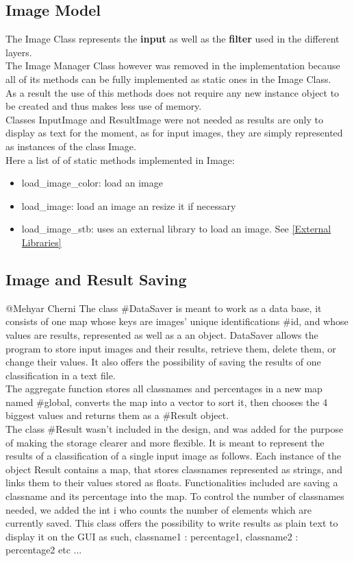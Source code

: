 \documentclass[parskip=full]{scrartcl}
\newcommand\tab[1][1cm]{\hspace*{#1}}
\begin{document}
	\subsection {Image Model}
	\tab The Image Class represents the \textbf{input} as well as the \textbf{filter} used in the different layers.\\
	The Image Manager Class however was removed in the implementation because all of its methods can be fully implemented as static ones in the Image Class.\\ As a result the use of this methods does not require any new instance object to be created and thus makes less use of memory. \\ Classes InputImage and ResultImage were not needed as results are only to display as text for the moment, as for input images, they are simply represented as instances of the class Image.\\ Here a list of of static methods implemented in Image:
	\begin {itemize}
		\item load\_image\_color: load an image
		\item load\_image: load an image an resize it if necessary
		\item load\_image\_stb: uses an external library to load an image. See \ref{External Libraries}
	\end{itemize}
	\subsection {Image and Result Saving}
	@Mehyar Cherni
	\tab The class #DataSaver is meant to work as a data base, it consists of one map whose keys are images' unique identifications #id, and whose values are results, represented as well as a an object. DataSaver allows the program to store input images and their results, retrieve them, delete them, or change their values. It also offers the possibility of saving the results of one classification in a text file. \\The aggregate function stores all classnames and percentages in a new map named #global, converts the map into a vector to sort it, then chooses the 4 biggest values and returns them as a #Result object.
\\The class #Result wasn't included in the design, and was added for the purpose of making the storage clearer and more flexible. It is meant to represent the results of a classification of a single input image as follows. Each instance of the object Result contains a map, that stores classnames represented as strings, and links them to their values stored as floats. Functionalities included are saving a classname and its percentage into the map. To control the number of classnames needed, we added the int i who counts the number of elements which are currently saved. This class offers the possibility to write results as plain text to display it on the GUI as such, classname1 : percentage1, classname2 : percentage2 etc ... 
\end{document}

